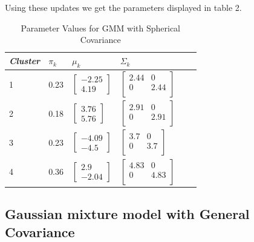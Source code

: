 \documentclass[paper=a4, fontsize=11pt]{scrartcl} %
\numberwithin{equation}{section} %
\numberwithin{figure}{section} %
\numberwithin{table}{section} %
\begin{document}
Using these updates we get the parameters displayed in table 2.
\begin{table}
	\caption {Parameter Values for GMM with Spherical Covariance} \label{tab:title} 
	\begin{center}		
		\begin{tabular}{*6l}   
			\toprule
			\emph{Cluster}&  $\pi_k$ & $\mu_k$ & $\Sigma_k$\\\midrule
			1 & 0.23 
			& $\begin{bmatrix}-2.25 \\ 4.19\end{bmatrix}$  
			& $\begin{bmatrix}
			2.44 & 0 \\
			0 & 2.44 \\ \end{bmatrix}$\\
			2 & 0.18 
			& $\begin{bmatrix} 3.76 \\ 5.76\end{bmatrix}$ 
			& $\begin{bmatrix}
			2.91 & 0 \\
			0 & 2.91 \\ \end{bmatrix}$\\
			3 & 0.23
			& $\begin{bmatrix}-4.09 \\ -4.5\end{bmatrix}$ 
			& $\begin{bmatrix}
			3.7 & 0 \\
			0 &  3.7 \\ \end{bmatrix}$\\	
			4 & 0.36
			& $\begin{bmatrix}2.9 \\-2.04 \end{bmatrix}$ 
			& $\begin{bmatrix}
			4.83 & 0 \\
			0 &  4.83 \\ \end{bmatrix}$	
			\\\bottomrule
			\hline
		\end{tabular}
	\end{center}
\end{table}

\subsection{Gaussian mixture model with General Covariance}
\end{document}
